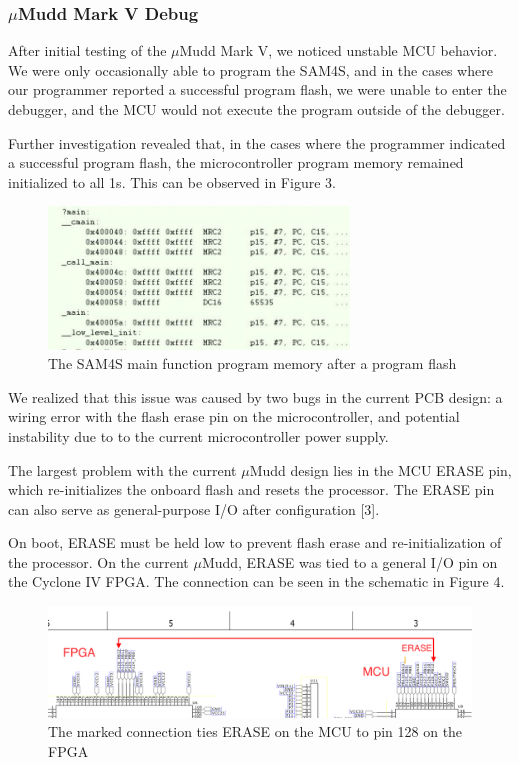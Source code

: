 \documentclass[12pt]{article}
\begin{document}
\subsubsection{$\mu$Mudd Mark V Debug}

After initial testing of the $\mu$Mudd Mark V, we noticed unstable MCU behavior. We were only occasionally able to program the SAM4S, and in the cases where our programmer reported a successful program flash, we were unable to enter the debugger, and the MCU would not execute the program outside of the debugger. 

Further investigation revealed that, in the cases where the programmer indicated a successful program flash, the microcontroller program memory remained initialized to all 1s. This can be observed in Figure 3. 

    \begin{figure}[h]
        \label{deadmemory}
        \begin{center}
            \includegraphics[width=8cm]{deadmemory.JPG}
            \caption{The SAM4S main function program memory after a program flash}
        \end{center}
    \end{figure}
    
We realized that this issue was caused by two bugs in the current PCB design: a wiring error with the flash erase pin on the microcontroller, and potential instability due to to the current microcontroller power supply. 

The largest problem with the current $\mu$Mudd design lies in the MCU ERASE pin, which re-initializes the onboard flash and resets the processor. The ERASE pin can also serve as general-purpose I/O after configuration [3].

On boot, ERASE must be held low to prevent flash erase and re-initialization of the processor. On the current $\mu$Mudd, ERASE was tied to a general I/O pin on the Cyclone IV FPGA. The connection can be seen in the schematic in Figure 4.

\begin{figure}[h]
    \label{eraseerror}
    \begin{center}
    	\includegraphics[width=16cm]{erase_error.png}
    	\caption{The marked connection ties ERASE on the MCU to pin 128 on the FPGA}
    \end{center}
\end{figure}
\end{document}
